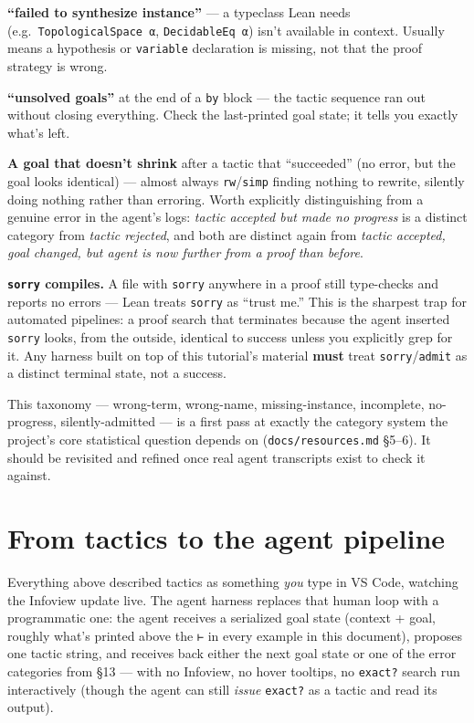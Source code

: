 \textbf{``failed to synthesize instance''} --- a typeclass Lean needs (e.g.\ \texttt{TopologicalSpace α}, \texttt{DecidableEq α}) isn't available in context. Usually means a hypothesis or \texttt{variable} declaration is missing, not that the proof strategy is wrong.

\textbf{``unsolved goals''} at the end of a \texttt{by} block --- the tactic sequence ran out without closing everything. Check the last-printed goal state; it tells you exactly what's left.

\textbf{A goal that doesn't shrink} after a tactic that ``succeeded'' (no error, but the goal looks identical) --- almost always \texttt{rw}/\texttt{simp} finding nothing to rewrite, silently doing nothing rather than erroring. Worth explicitly distinguishing from a genuine error in the agent's logs: \emph{tactic accepted but made no progress} is a distinct category from \emph{tactic rejected}, and both are distinct again from \emph{tactic accepted, goal changed, but agent is now further from a proof than before}.

\textbf{\texttt{sorry} compiles.} A file with \texttt{sorry} anywhere in a proof still type-checks and reports no errors --- Lean treats \texttt{sorry} as ``trust me.'' This is the sharpest trap for automated pipelines: a proof search that terminates because the agent inserted \texttt{sorry} looks, from the outside, identical to success unless you explicitly grep for it. Any harness built on top of this tutorial's material \textbf{must} treat \texttt{sorry}/\texttt{admit} as a distinct terminal state, not a success.

This taxonomy --- wrong-term, wrong-name, missing-instance, incomplete, no-progress, silently-admitted --- is a first pass at exactly the category system the project's core statistical question depends on (\texttt{docs/resources.md} \S5--6). It should be revisited and refined once real agent transcripts exist to check it against.

\section{From tactics to the agent pipeline}

Everything above described tactics as something \emph{you} type in VS Code, watching the Infoview update live. The agent harness replaces that human loop with a programmatic one: the agent receives a serialized goal state (context + goal, roughly what's printed above the \texttt{⊢} in every example in this document), proposes one tactic string, and receives back either the next goal state or one of the error categories from \S13 --- with no Infoview, no hover tooltips, no \texttt{exact?} search run interactively (though the agent can still \emph{issue} \texttt{exact?} as a tactic and read its output).

